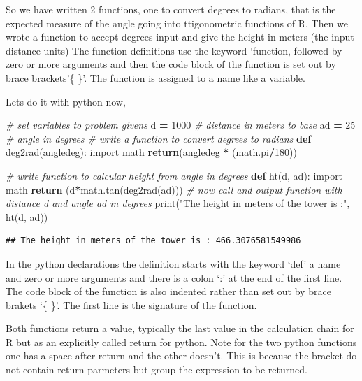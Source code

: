 \documentclass[]{book}
\newenvironment{Shaded}{\begin{snugshade}}{\end{snugshade}}
\newcommand{\KeywordTok}[1]{\textcolor[rgb]{0.13,0.29,0.53}{\textbf{#1}}}
\newcommand{\DecValTok}[1]{\textcolor[rgb]{0.00,0.00,0.81}{#1}}
\newcommand{\StringTok}[1]{\textcolor[rgb]{0.31,0.60,0.02}{#1}}
\newcommand{\ImportTok}[1]{#1}
\newcommand{\CommentTok}[1]{\textcolor[rgb]{0.56,0.35,0.01}{\textit{#1}}}
\newcommand{\ControlFlowTok}[1]{\textcolor[rgb]{0.13,0.29,0.53}{\textbf{#1}}}
\newcommand{\OperatorTok}[1]{\textcolor[rgb]{0.81,0.36,0.00}{\textbf{#1}}}
\newcommand{\BuiltInTok}[1]{#1}
\newcommand{\NormalTok}[1]{#1}
\theoremstyle{definition}
\theoremstyle{definition}
\theoremstyle{definition}
\theoremstyle{remark}
\begin{document}
So we have written 2 functions, one to convert degrees to radians, that
is the expected measure of the angle going into ttigonometric functions
of R. Then we wrote a function to accept degrees input and give the
height in meters (the input distance units) The function definitions use
the keyword `function, followed by zero or more arguments and then the
code block of the function is set out by brace brackets'\{ \}'. The
function is assigned to a name like a variable.

Lets do it with python now,

\begin{Shaded}
\begin{Highlighting}[]
\CommentTok{# set variables to problem givens}
\NormalTok{d }\OperatorTok{=} \DecValTok{1000}    \CommentTok{# distance in meters to base}
\NormalTok{ad }\OperatorTok{=} \DecValTok{25}     \CommentTok{# angle in degrees}
\CommentTok{# write a function to convert degrees to radians}
\KeywordTok{def}\NormalTok{ deg2rad(angledeg):}
    \ImportTok{import}\NormalTok{ math}
    \ControlFlowTok{return}\NormalTok{(angledeg }\OperatorTok{*}\NormalTok{ (math.pi}\OperatorTok{/}\DecValTok{180}\NormalTok{))}
    
\CommentTok{# write function to calcular height from angle in degrees}
\KeywordTok{def}\NormalTok{ ht(d, ad):}
  \ImportTok{import}\NormalTok{ math}
  \ControlFlowTok{return}\NormalTok{ (d}\OperatorTok{*}\NormalTok{math.tan(deg2rad(ad)))}
\CommentTok{# now call and output function with distance d and angle ad in degrees}
\BuiltInTok{print}\NormalTok{(}\StringTok{"The height in meters of the tower is :"}\NormalTok{, ht(d, ad))}
\end{Highlighting}
\end{Shaded}

\begin{verbatim}
## The height in meters of the tower is : 466.3076581549986
\end{verbatim}

In the python declarations the definition starts with the keyword `def'
a name and zero or more arguments and there is a colon `:' at the end of
the first line. The code block of the function is also indented rather
than set out by brace brakets `\{ \}'. The first line is the signature
of the function.

Both functions return a value, typically the last value in the
calculation chain for R but as an explicitly called return for python.
Note for the two python functions one has a space after return and the
other doesn't. This is because the bracket do not contain return
parmeters but group the expression to be returned.
\end{document}
